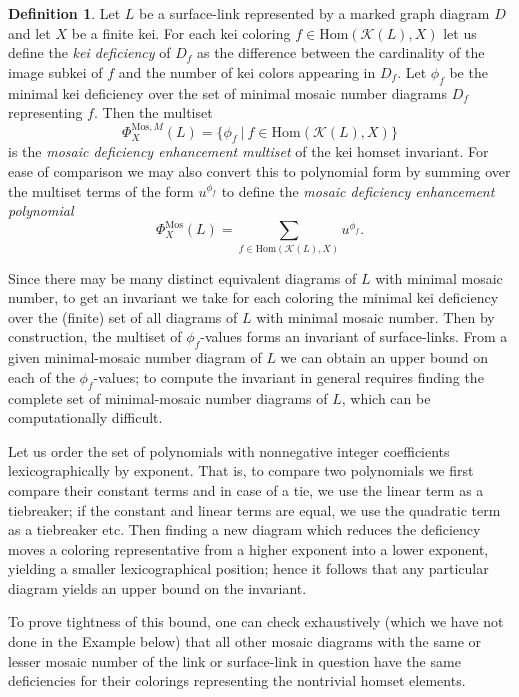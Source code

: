\documentclass{article}
\theoremstyle{definition}
\newtheorem{definition}{Definition}
\begin{document}
\begin{definition}\label{def:k}
Let $L$ be a surface-link represented by a marked graph diagram $D$ 
and let $X$ be a finite kei. For each kei coloring
$f\in\mathrm{Hom}(\mathcal{K}(L),X)$ let us define the \textit{kei deficiency} 
of $D_f$ as the difference between the cardinality of the image
subkei of $f$ and the number of kei colors appearing in $D_f$. 
Let $\phi_f$ be the minimal kei deficiency over the set of minimal mosaic 
number diagrams $D_f$ representing $f$. Then the multiset 
\[\Phi_X^{\mathrm{Mos},M}(L)=\{\phi_f\ |\ f\in\mathrm{Hom}(\mathcal{K}(L),X)\}\]
is the \textit{mosaic deficiency enhancement multiset} of the kei homset 
invariant.
For ease of comparison we may also convert this to polynomial form by summing
over the multiset terms of the form $u^{\phi_f}$ to define the 
\textit{mosaic deficiency enhancement polynomial} 
\[\Phi_X^{\mathrm{Mos}}(L)=\sum_{f\in\mathrm{Hom}(\mathcal{K}(L),X)} u^{\phi_f}.\]
\end{definition}

Since there may be many distinct equivalent diagrams of $L$ with minimal 
mosaic number, to get an invariant we take for each coloring the minimal kei 
deficiency over the (finite) set
of all diagrams of $L$ with minimal mosaic number. Then by construction, the 
multiset of $\phi_f$-values forms an 
invariant of surface-links. From a given minimal-mosaic number diagram of $L$
we can obtain an upper bound on each of the $\phi_f$-values; to compute the 
invariant in general requires finding the complete set of minimal-mosaic number
diagrams of $L$, which can be computationally difficult. 

Let us order the set of polynomials with nonnegative integer coefficients  lexicographically by exponent. That is, to compare two polynomials we first compare their constant terms and in case of a tie, we use the linear term as a tiebreaker; if the constant and linear terms are equal, we use the quadratic term as a tiebreaker etc.
Then finding a new diagram which reduces the deficiency moves a coloring 
representative from a higher exponent into a lower exponent, yielding 
a smaller lexicographical position; hence it follows that any particular diagram yields
an upper bound on the invariant. 

To prove tightness of this
bound, one can check exhaustively (which we have not done in the Example below) that all other
mosaic diagrams with the same or lesser mosaic number of the link or surface-link in question have the same deficiencies for their colorings
representing the nontrivial homset elements.
\end{document}
